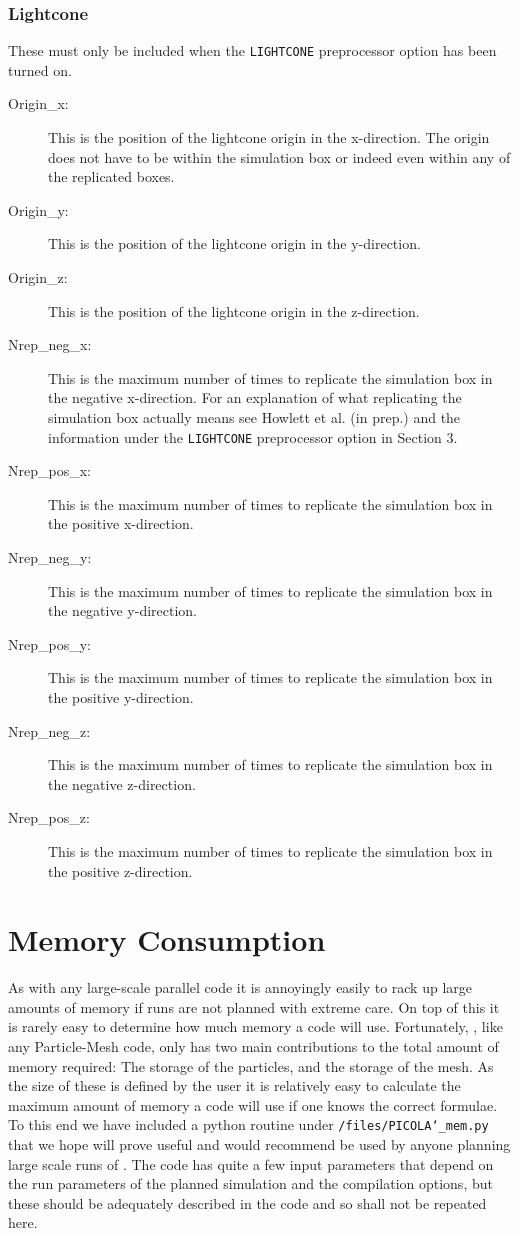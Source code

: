 \documentclass[12pt,twoside,a4paper]{article}
\begin{document}
\subsubsection{Lightcone}
These must only be included when the \texttt{LIGHTCONE} preprocessor option has been turned on.
\begin{description}
\item[Origin\_x:]{This is the position of the lightcone origin in the x-direction. The origin does not have to be within the simulation box or indeed even within any of the replicated boxes.}
\item[Origin\_y:]{This is the position of the lightcone origin in the y-direction.}
\item[Origin\_z:]{This is the position of the lightcone origin in the z-direction.}
\item[Nrep\_neg\_x:]{This is the maximum number of times to replicate the simulation box in the negative x-direction. For an explanation of what replicating the simulation box actually means see Howlett et al. (in prep.) and the information under the \texttt{LIGHTCONE} preprocessor option in Section 3.}
\item[Nrep\_pos\_x:]{This is the maximum number of times to replicate the simulation box in the positive x-direction.}
\item[Nrep\_neg\_y:]{This is the maximum number of times to replicate the simulation box in the negative y-direction.}
\item[Nrep\_pos\_y:]{This is the maximum number of times to replicate the simulation box in the positive y-direction.}
\item[Nrep\_neg\_z:]{This is the maximum number of times to replicate the simulation box in the negative z-direction.}
\item[Nrep\_pos\_z:]{This is the maximum number of times to replicate the simulation box in the positive z-direction.}
\end{description}

\section{Memory Consumption}
As with any large-scale parallel code it is annoyingly easily to rack up large amounts of memory if runs are not planned with extreme care. On top of this it is rarely easy to determine how much memory a code will use. Fortunately, {\PICOLA}, like any Particle-Mesh code, only has two main contributions to the total amount of memory required: The storage of the particles, and the storage of the mesh. As the size of these is defined by the user it is relatively easy to calculate the maximum amount of memory a code will use if one knows the correct formulae. To this end we have included a python routine under \texttt{/files/PICOLA\char`_mem.py} that we hope will prove useful and would recommend be used by anyone planning large scale runs of {\PICOLA}.
The code has quite a few input parameters that depend on the run parameters of the planned simulation and the compilation options, but these should be adequately described in the code and so shall not be repeated here.
\end{document}
